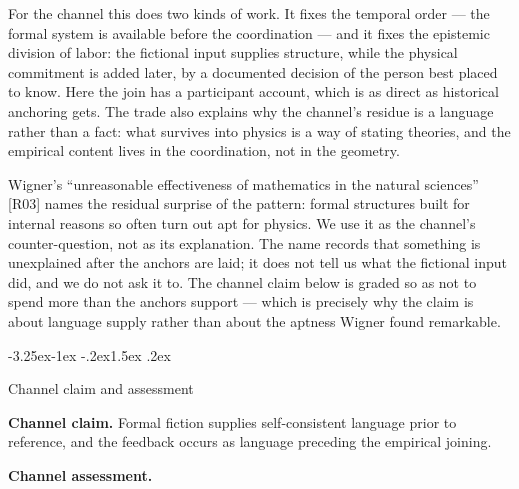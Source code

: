 \documentclass[11pt,a4paper]{article}
\makeatletter
\renewcommand\subsection{\@startsection{subsection}{2}{\z@}%
  {-3.25ex\@plus -1ex \@minus -.2ex}{1.5ex \@plus .2ex}%
  {\normalfont\large\bfseries\raggedright}}
\makeatother
\begin{document}
For the channel this does two kinds of work. It fixes the temporal order — the formal system is available before the coordination — and it fixes the epistemic division of labor: the fictional input supplies structure, while the physical commitment is added later, by a documented decision of the person best placed to know. Here the join has a participant account, which is as direct as historical anchoring gets. The trade also explains why the channel's residue is a language rather than a fact: what survives into physics is a way of stating theories, and the empirical content lives in the coordination, not in the geometry.

Wigner's ``unreasonable effectiveness of mathematics in the natural sciences'' [R03] names the residual surprise of the pattern: formal structures built for internal reasons so often turn out apt for physics. We use it as the channel's counter-question, not as its explanation. The name records that something is unexplained after the anchors are laid; it does not tell us what the fictional input did, and we do not ask it to. The channel claim below is graded so as not to spend more than the anchors support — which is precisely why the claim is about language supply rather than about the aptness Wigner found remarkable.

\subsection{Channel claim and assessment}

\textbf{Channel claim.} Formal fiction supplies self-consistent language prior to reference, and the feedback occurs as language preceding the empirical joining.

\textbf{Channel assessment.}
\end{document}
